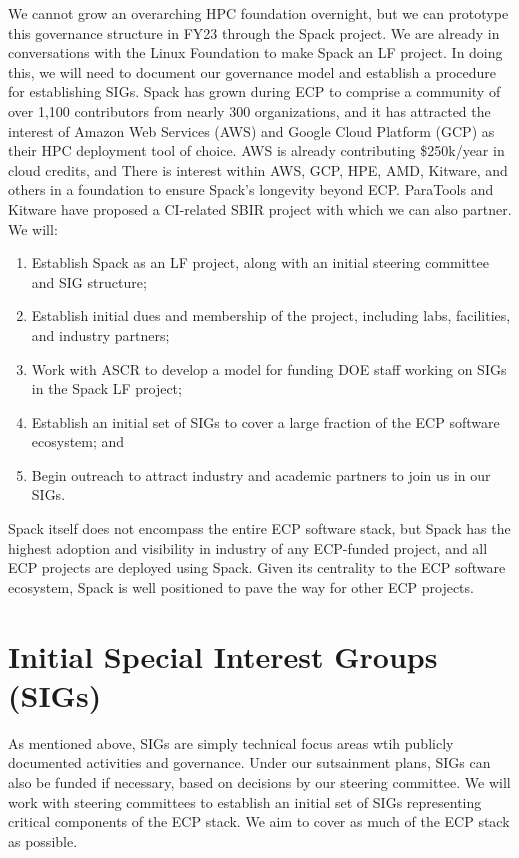 \documentclass[11pt]{article}
\begin{document}
We cannot grow an overarching HPC foundation overnight, but we can prototype this
governance structure in FY23 through the Spack project. We are already in conversations
with the Linux Foundation to make Spack an LF project. In doing this, we will need to
document our governance model and establish a procedure for establishing SIGs. Spack has
grown during ECP to comprise a community of over 1,100 contributors from nearly 300
organizations, and it has attracted the interest of Amazon Web Services (AWS) and Google
Cloud Platform (GCP) as their HPC deployment tool of choice. AWS is already contributing
\$250k/year in cloud credits, and There is interest within AWS, GCP, HPE, AMD, Kitware,
and others in a foundation to ensure Spack's longevity beyond ECP. ParaTools and Kitware
have proposed a CI-related SBIR project with which we can also partner. We will:

\begin{enumerate}
\item Establish Spack as an LF project, along with an initial steering committee and SIG
  structure;
\item Establish initial dues and membership of the project, including labs, facilities,
  and industry partners;
\item Work with ASCR to develop a model for funding DOE staff working on SIGs in the
  Spack LF project;
\item Establish an initial set of SIGs to cover a large fraction of the ECP software
  ecosystem; and
\item Begin outreach to attract industry and academic partners to join us in our SIGs.
\end{enumerate}

Spack itself does not encompass the entire ECP software stack, but Spack has the highest
adoption and visibility in industry of any ECP-funded project, and all ECP projects are
deployed using Spack. Given its centrality to the ECP software ecosystem, Spack is well
positioned to pave the way for other ECP projects.

\section{Initial Special Interest Groups (SIGs)}

As mentioned above, SIGs are simply technical focus areas wtih publicly documented
activities and governance. Under our sutsainment plans, SIGs can also be funded if
necessary, based on decisions by our steering committee. We will work with steering
committees to establish an initial set of SIGs representing critical components of the
ECP stack. We aim to cover as much of the ECP stack as possible.
\end{document}
